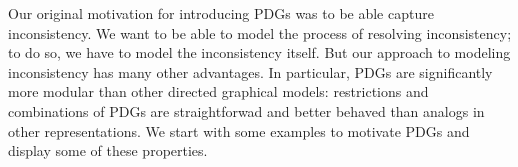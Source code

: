 \documentclass{article}
\numberwithin{equation}{section}
\begin{document}
Our original motivation for introducing PDGs was to be able capture
inconsistency. We want to be
able to model the process of resolving inconsistency; to do so, we have to model
the inconsistency itself. But our approach to modeling inconsistency
has many other advantages. 
In particular, PDGs are significantly more modular than other directed
	graphical models: restrictions and combinations of PDGs are 
	straightforwad and better behaved than analogs in other representations.
	We start with some examples to motivate PDGs and display some of these properties. 
\end{document}

